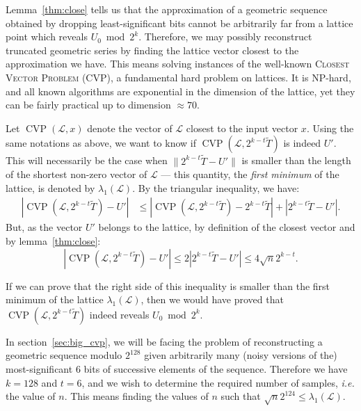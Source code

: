 \documentclass[submission,svgnames,journal=tosc]{iacrtrans}
\DeclareMathOperator{\CVP}{CVP}
\begin{document}
Lemma~\ref{thm:close} tells us that the approximation of a geometric sequence
obtained by dropping least-significant bits cannot be arbitrarily far from a
lattice point which reveals $U_0 \bmod 2^k$. Therefore, we may possibly
reconstruct truncated geometric series by finding the lattice vector closest to
the approximation we have. This means solving instances of the well-known
\textsc{Closest Vector Problem} (CVP), a fundamental hard problem on
lattices. It is NP-hard, and all known algorithms are exponential in the
dimension of the lattice, yet they can be fairly practical up to dimension
$\approx 70$.

Let $\CVP(\mathcal{L}, x)$ denote the vector of $\mathcal{L}$ closest to the
input vector $x$. Using the same notations as above, we want to know if
$\CVP\left(\mathcal{L}, 2^{k-t}\widetilde{T}\right)$ is indeed $U'$. This
will necessarily be the case when $\|2^{k-t}\widetilde{T} - U'\|$ is smaller
than the length of the shortest non-zero vector of $\mathcal{L}$ --- this quantity,
the \emph{first minimum} of the lattice, is denoted by $\lambda_1(\mathcal{L})$.
By the triangular inequality, we have:
\begin{align*}
|\CVP(\mathcal{L}, 2^{k-t}\widetilde{T}) - U'| %
                             & \leq \left| \CVP\left(\mathcal{L}, 2^{k-t}\widetilde{T} \right) - 2^{k-t}\widetilde{T}\right | + \left|2^{k-t}\widetilde{T} - U'\right|.
\end{align*}
But, as the vector $U'$ belongs to the lattice, by definition of the closest
vector and by lemma~\ref{thm:close}:
\[
  |\CVP(\mathcal{L}, 2^{k-t}\widetilde{T}) - U'| \leq 2 \left|2^{k-t} \widetilde{T} - U' \right| \leq 4 \sqrt{n} 2^{k-t}.
\]

If we can prove that the right side of this inequality is smaller than the first
minimum of the lattice $\lambda_1(\mathcal{L})$, then we would have proved that
$\CVP(\mathcal{L}, 2^{k-t}\widetilde{T})$ indeed reveals $U_0 \bmod 2^k$.

In section~\ref{sec:big_cvp}, we will be facing the problem of reconstructing a
geometric sequence modulo $2^{128}$ given arbitrarily many (noisy versions of
the) most-significant $6$ bits of successive elements of the sequence. Therefore
we have $k=128$ and $t=6$, and we wish to determine the required number of
samples, \textit{i.e.} the value of $n$. This means finding the values of $n$
such that $\sqrt{n} 2^{124} \leq \lambda_1\left(\mathcal{L}\right)$.
\end{document}
